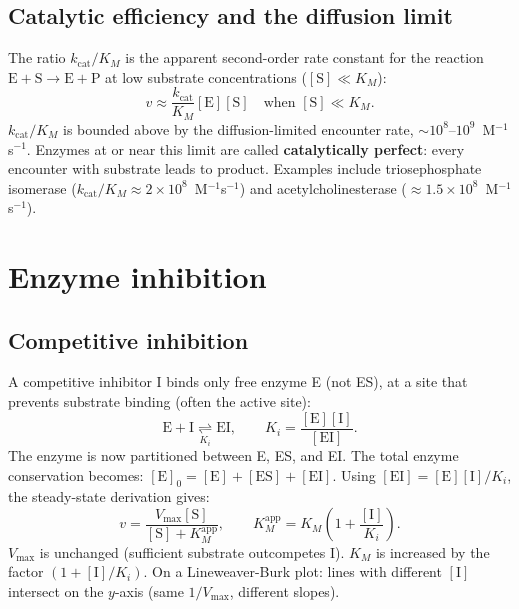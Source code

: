 \documentclass[12pt, a4paper, oneside]{report}
\begin{document}
\subsection{Catalytic efficiency and the diffusion limit}

The ratio $k_\text{cat}/K_M$ is the apparent second-order rate constant
for the reaction $\mathrm{E} + \mathrm{S} \to \mathrm{E} + \mathrm{P}$
at low substrate concentrations ($[\mathrm{S}] \ll K_M$):
\[
  v \approx \frac{k_\text{cat}}{K_M}[\mathrm{E}][\mathrm{S}]
  \quad \text{when } [\mathrm{S}] \ll K_M.
\]
$k_\text{cat}/K_M$ is bounded above by the diffusion-limited encounter
rate, $\sim 10^8$--$10^9$~M$^{-1}$s$^{-1}$. Enzymes at or near this
limit are called \textbf{catalytically perfect}: every encounter with
substrate leads to product. Examples include triosephosphate isomerase
($k_\text{cat}/K_M \approx 2\times10^8$~M$^{-1}$s$^{-1}$) and
acetylcholinesterase ($\approx 1.5\times10^8$~M$^{-1}$s$^{-1}$).

\section{Enzyme inhibition}

\subsection{Competitive inhibition}

A competitive inhibitor I binds only free enzyme E (not ES), at a site
that prevents substrate binding (often the active site):
\[
  \mathrm{E} + \mathrm{I} \underset{K_i}{\rightleftharpoons} \mathrm{EI},
  \qquad K_i = \frac{[\mathrm{E}][\mathrm{I}]}{[\mathrm{EI}]}.
\]
The enzyme is now partitioned between E, ES, and EI. The total enzyme
conservation becomes:
$[\mathrm{E}]_0 = [\mathrm{E}] + [\mathrm{ES}] + [\mathrm{EI}]$.
Using $[\mathrm{EI}] = [\mathrm{E}][\mathrm{I}]/K_i$, the steady-state
derivation gives:
\begin{equation}
  v = \frac{V_{\max}[\mathrm{S}]}{[\mathrm{S}] + K_M^\text{app}},
  \qquad
  K_M^\text{app} = K_M\!\left(1 + \frac{[\mathrm{I}]}{K_i}\right).
  \label{eq:competitive}
\end{equation}
$V_{\max}$ is unchanged (sufficient substrate outcompetes I). $K_M$ is
increased by the factor $(1 + [\mathrm{I}]/K_i)$. On a Lineweaver-Burk
plot: lines with different $[\mathrm{I}]$ intersect on the $y$-axis
(same $1/V_{\max}$, different slopes).
\end{document}
